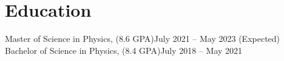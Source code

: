 
\section{Education}
\resumeHeadingListStart{}
{Master of Science in Physics, (8.6 GPA)}{July 2021 -- May 2023 (Expected)}
\resumeHeadingListEnd{}
\resumeHeadingListStart{}
{Bachelor of Science in Physics, (8.4 GPA)}{July 2018 -- May 2021}
\resumeHeadingListEnd{}